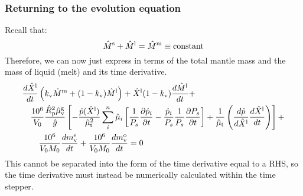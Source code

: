 \subsubsection{Returning to the evolution equation}
Recall that:
\begin{equation}
\hat{M}^{\rm s} + \hat{M}^{\rm l} = \hat{M}^{\rm m} \equiv \text{constant}
\label{eq:mantle_mass}
\end{equation}
Therefore, we can now just express in terms of the total mantle mass and the mass of liquid (melt) and its time derivative.  
\begin{align}
&\frac{d \hat{X}^{\rm l}}{d t} \left(k_{\rm v} \hat{M}^{\rm m} + (1-k_{\rm v}) \hat{M}^{\rm l} \right)
+ \hat{X}^{\rm l} (1-k_{\rm v}) \frac{d \hat{M}^{\rm l}}{d t} + \nonumber \\
&\quad \frac{10^6}{V_0} \frac{\hat{R}_{\rm p}^2 \hat{\mu}_{\rm v}^{\rm g}}{\hat{g}}
\left[
-\frac{\hat{p}(\hat{X}^{\rm l})}{\hat{\mu}_{\rm t}^2} \sum_i^n \hat{\mu}_i \left[ \frac{1}{P_s} \frac{\partial \hat{p}_i}{\partial t} - \frac{\hat{p}_i}{P_s} \frac{1}{P_s} \frac{\partial P_s}{\partial t} \right] + \frac{1}{\hat{\mu}_{\rm t}} \left( \frac{d \hat{p}}{d \hat{X}^{\rm l}} \frac{d \hat{X}^{\rm l}}{d t} \right)
\right]+ \nonumber \\
& \qquad \frac{10^6}{V_0 M_0} \frac{dm_{\rm v}^{\rm e}}{dt} + \frac{10^6}{V_0 M_0} \frac{dm_{\rm v}^{\rm o}}{dt} = 0
\end{align}
This cannot be separated into the form of the time derivative equal to a RHS, so the time derivative must instead be numerically calculated within the time stepper.
